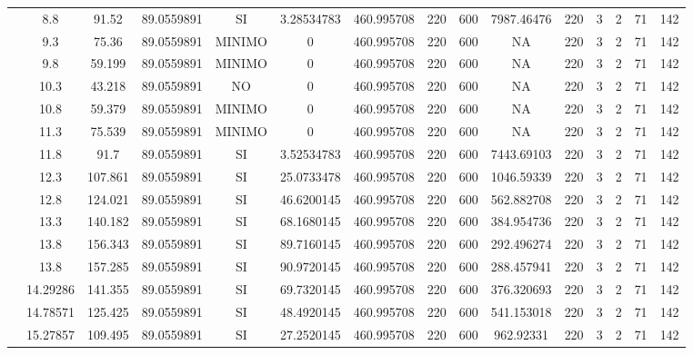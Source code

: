 \begin{table}[H]
{\begin{tabular}{|c|c|c|c|c|c|c|c|c|c|c|c|c|c|c|}
\cline{2-15}    & 8.8 & 91.52 & 89.0559891 & SI  & 3.28534783 & 460.995708 & 220 & 600 & 7987.46476 & 220 & 3   & 2   & 71  & 142 \bigstrut\\
\cline{2-15}    & 9.3 & 75.36 & 89.0559891 & MINIMO & 0   & 460.995708 & 220 & 600 & NA  & 220 & 3   & 2   & 71  & 142 \bigstrut\\
\cline{2-15}    & 9.8 & 59.199 & 89.0559891 & MINIMO & 0   & 460.995708 & 220 & 600 & NA  & 220 & 3   & 2   & 71  & 142 \bigstrut\\
\cline{2-15}    & 10.3 & 43.218 & 89.0559891 & NO  & 0   & 460.995708 & 220 & 600 & NA  & 220 & 3   & 2   & 71  & 142 \bigstrut\\
\cline{2-15}    & 10.8 & 59.379 & 89.0559891 & MINIMO & 0   & 460.995708 & 220 & 600 & NA  & 220 & 3   & 2   & 71  & 142 \bigstrut\\
\cline{2-15}    & 11.3 & 75.539 & 89.0559891 & MINIMO & 0   & 460.995708 & 220 & 600 & NA  & 220 & 3   & 2   & 71  & 142 \bigstrut\\
\cline{2-15}    & 11.8 & 91.7 & 89.0559891 & SI  & 3.52534783 & 460.995708 & 220 & 600 & 7443.69103 & 220 & 3   & 2   & 71  & 142 \bigstrut\\
\cline{2-15}    & 12.3 & 107.861 & 89.0559891 & SI  & 25.0733478 & 460.995708 & 220 & 600 & 1046.59339 & 220 & 3   & 2   & 71  & 142 \bigstrut\\
\cline{2-15}    & 12.8 & 124.021 & 89.0559891 & SI  & 46.6200145 & 460.995708 & 220 & 600 & 562.882708 & 220 & 3   & 2   & 71  & 142 \bigstrut\\
\cline{2-15}    & 13.3 & 140.182 & 89.0559891 & SI  & 68.1680145 & 460.995708 & 220 & 600 & 384.954736 & 220 & 3   & 2   & 71  & 142 \bigstrut\\
\cline{2-15}    & 13.8 & 156.343 & 89.0559891 & SI  & 89.7160145 & 460.995708 & 220 & 600 & 292.496274 & 220 & 3   & 2   & 71  & 142 \bigstrut\\
\cline{2-15}    & 13.8 & 157.285 & 89.0559891 & SI  & 90.9720145 & 460.995708 & 220 & 600 & 288.457941 & 220 & 3   & 2   & 71  & 142 \bigstrut\\
\cline{2-15}    & 14.29286 & 141.355 & 89.0559891 & SI  & 69.7320145 & 460.995708 & 220 & 600 & 376.320693 & 220 & 3   & 2   & 71  & 142 \bigstrut\\
\cline{2-15}    & 14.78571 & 125.425 & 89.0559891 & SI  & 48.4920145 & 460.995708 & 220 & 600 & 541.153018 & 220 & 3   & 2   & 71  & 142 \bigstrut\\
\cline{2-15}    & 15.27857 & 109.495 & 89.0559891 & SI  & 27.2520145 & 460.995708 & 220 & 600 & 962.92331 & 220 & 3   & 2   & 71  & 142 \bigstrut\\

\end{tabular}}
\end{table}
